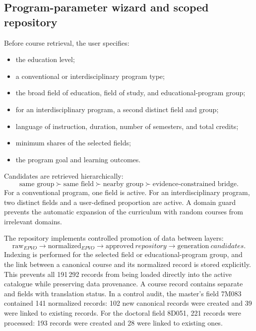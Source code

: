 \documentclass[twoside,11pt]{article}
\begin{document}
\subsection{Program-parameter wizard and scoped repository}

Before course retrieval, the user specifies:
\begin{itemize}
  \item the education level;
  \item a conventional or interdisciplinary program type;
  \item the broad field of education, field of study, and educational-program group;
  \item for an interdisciplinary program, a second distinct field and group;
  \item language of instruction, duration, number of semesters, and total credits;
  \item minimum shares of the selected fields;
  \item the program goal and learning outcomes.
\end{itemize}

Candidates are retrieved hierarchically:
\begin{equation}
  \text{same group}
  \succ
  \text{same field}
  \succ
  \text{nearby group}
  \succ
  \text{evidence-constrained bridge}.
  \label{eq:scope}
\end{equation}
For a conventional program, one field is active. For an interdisciplinary program, two distinct fields and a user-defined proportion are active. A domain guard prevents the automatic expansion of the curriculum with random courses from irrelevant domains.

The repository implements controlled promotion of data between layers:
\begin{equation}
  \mathrm{raw}_{EPVO}
  \rightarrow
  \mathrm{normalized}_{EPVO}
  \rightarrow
  \mathrm{approved}\ repository
  \rightarrow
  \mathrm{generation}\ candidates.
  \label{eq:repository-layers}
\end{equation}
Indexing is performed for the selected field or educational-program group, and the link between a canonical course and its normalized record is stored explicitly. This prevents all 191\,292 records from being loaded directly into the active catalogue while preserving data provenance. A course record contains separate  and  fields with translation status. In a control audit, the master's field 7M083 contained 141 normalized records: 102 new canonical records were created and 39 were linked to existing records. For the doctoral field 8D051, 221 records were processed: 193 records were created and 28 were linked to existing ones.
\end{document}
